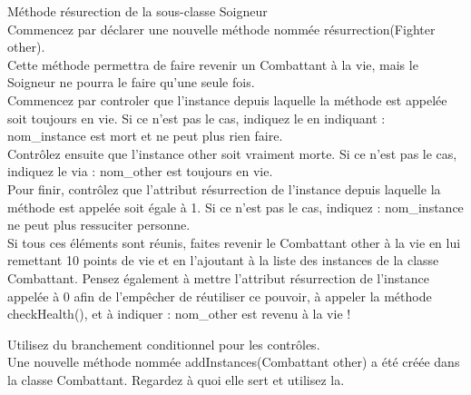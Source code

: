 \begin{Exercice}[10 minutes] Méthode résurection de la sous-classe Soigneur \\

Commencez par déclarer une nouvelle méthode nommée résurrection(Fighter other). \\

Cette méthode permettra de faire revenir un Combattant à la vie, mais le Soigneur ne pourra le faire qu'une seule fois. \\

Commencez par controler que l'instance depuis laquelle la méthode est appelée soit toujours en vie. Si ce n'est pas le cas, indiquez le en indiquant : nom\_instance est mort et ne peut plus rien faire.  \\ 

Contrôlez ensuite que l'instance other soit vraiment morte. Si ce n'est pas le cas, indiquez le via : nom\_other est toujours en vie. \\

Pour finir, contrôlez que l'attribut résurrection de l'instance depuis laquelle la méthode est appelée soit égale à 1. Si ce n'est pas le cas, indiquez : nom\_instance ne peut plus ressuciter personne.\\

Si tous ces éléments sont réunis, faites revenir le Combattant other à la vie en lui remettant 10 points de vie et en l'ajoutant à la liste des instances de la classe Combattant. Pensez également à mettre l'attribut résurrection de l'instance appelée à   
0 afin de l'empêcher de réutiliser ce pouvoir, à appeler la méthode checkHealth(), et à indiquer : nom\_other est revenu à la vie ! \\

\begin{conseil}
Utilisez du branchement conditionnel pour les contrôles. \\

Une nouvelle méthode nommée addInstances(Combattant other) a été créée dans la classe Combattant. Regardez à quoi elle sert et utilisez la. \\
\end{conseil}

\begin{solution}
	
\end{solution}

\end{Exercice}

